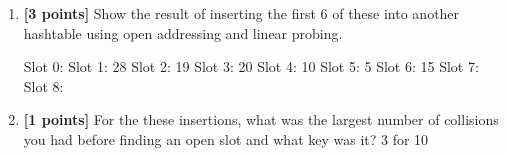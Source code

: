 \documentclass[11pt]{article}
\begin{document}
\begin{enumerate}
\begin{enumerate}
\item \textbf{[3 points]} Show the result of inserting the first 6 of these into another hashtable using open addressing and linear probing.

Slot 0: 
Slot 1: 28
Slot 2: 19
Slot 3: 20
Slot 4: 10
Slot 5: 5
Slot 6: 15
Slot 7: 
Slot 8: 

\item \textbf{[1 points]} For the these insertions, what was the largest number of collisions you had before finding an open slot and what key was it?
3 for 10


\end{enumerate}

\end{enumerate}
\end{document}

